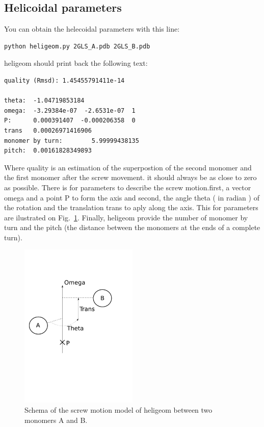 \documentclass[12pt,a4paper]{article}
\begin{document}
\subsection{Helicoidal parameters}
You can obtain the helecoidal parameters with this line:
\begin{verbatim}
python heligeom.py 2GLS_A.pdb 2GLS_B.pdb
\end{verbatim}
heligeom should print back the following text:
\begin{verbatim}
quality (Rmsd): 1.45455791411e-14

theta:  -1.04719853184
omega:  -3.29384e-07  -2.6531e-07  1
P:      0.000391407  -0.000206358  0
trans   0.00026971416906
monomer by turn:        5.99999438135
pitch:  0.00161828349893
\end{verbatim}

Where quality is an estimation of the superpostion of the second monomer and the first monomer after the screw movement. it should always be as close to zero as possible. There is for parameters to describe the screw motion.first, a vector omega and a point P to form the axis and second, the angle theta ( in radian ) of the rotation and the translation trans to aply along the axis. This for parameters are ilustrated on Fig.~\ref{screw}. Finally, heligeom provide the number of monomer by turn and the pitch (the distance between the monomers at the ends of a complete turn).

\begin{figure}[htbp]
\center
\includegraphics*[width=0.50\textwidth]{img/schema_heligeom.pdf}
\caption{Schema of the screw motion model of heligeom between two monomers A and B.}
\label{screw}
\end{figure}
\newpage
\end{document}
